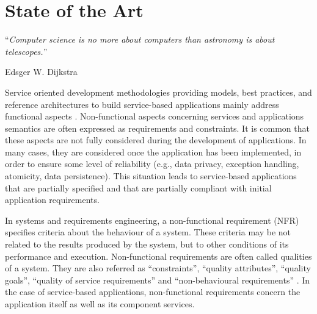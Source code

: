 \chapter{State of the Art}
\label{chap:state_art}
  
\epigraph{``\textit{Computer science is no more about computers than astronomy is
about telescopes.}''}{Edsger W. Dijkstra}
 
 
Service oriented development methodologies providing
models, best practices, and reference architectures to build service-based
applications mainly address functional aspects \cite{sommerville08}. Non-functional aspects concerning services and applications semantics are often
expressed as requirements and constraints.
It is common that these aspects are not fully considered during the
development of applications. In many cases, they are considered once the
application has been implemented, in order to ensure some
level of reliability (e.g., data privacy, exception handling,
atomicity, data persistence). 
This situation leads to service-based
applications that are partially specified and that are
partially compliant with initial application requirements. 


In systems and requirements engineering, a non-functional
requirement (NFR) specifies criteria about the behaviour of a
system. These criteria may be not related to the results produced by the
system, but to other conditions of its performance and execution. 
Non-functional requirements are often called qualities of a system. 
They are also referred as ``constraints'', ``quality attributes'', ``quality goals'', ``quality of
service requirements'' and ``non-behavioural requirements'' \cite{Stellman2005}. 
In the case of service-based applications, non-functional requirements concern
the application itself as well as its component services. 

